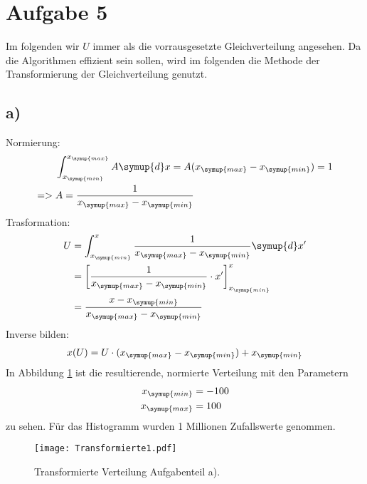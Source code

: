 \section{Aufgabe 5}
Im folgenden wir $U$ immer als die vorrausgesetzte Gleichverteilung angesehen.
Da die Algorithmen effizient sein sollen, wird im folgenden die Methode der Transformierung der Gleichverteilung genutzt.

\subsection{a)}
Normierung:
\begin{align*}
  &\int_{x_{\symup{min}}}^{x_{\symup{max}}} A \symup{d}x = A(x_{\symup{max}}-x_{\symup{min}}) = 1 \\
  => \; &A=\frac{1}{x_{\symup{max}}-x_{\symup{min}}}
\end{align*}
Trasformation:
\begin{align*}
  U &= \int_{x_{\symup{min}}}^{x} \frac{1}{x_{\symup{max}}-x_{\symup{min}}} \symup{d}x'\\
  &= \left[ \frac{1}{x_{\symup{max}}-x_{\symup{min}}} \cdot x' \right]_{x_{\symup{min}}}^{x} \\
  &= \frac{x-x_{\symup{min}}}{x_{\symup{max}}-x_{\symup{min}}}
\end{align*}
Inverse bilden:
\begin{align*}
  x(U) = U \cdot (x_{\symup{max}}-x_{\symup{min}}) + x_{\symup{min}}
\end{align*}
In Abbildung \ref{5.a} ist die resultierende, normierte Verteilung mit den Parametern
\begin{align*}
  x_{\symup{min}} &= -100 \\
  x_{\symup{max}} &= 100
\end{align*}
zu sehen. Für das Histogramm wurden 1 Millionen Zufallswerte genommen.
\begin{figure}[h]
  \centering
  \texttt{[image: Transformierte1.pdf]}
  \caption{Transformierte Verteilung Aufgabenteil a).}
  \label{5.a}
\end{figure}


